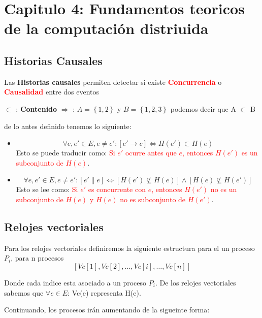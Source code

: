 \section{Capitulo 4: Fundamentos teoricos de la computación distriuida}
\subsection{Historias Causales}
Las \textbf{Historias causales} permiten detectar si existe \textcolor{red}{\textbf{Concurrencia}} o \textcolor{red}{\textbf{Causalidad}} entre dos eventos

\begin{center}
    $\subset$ : \textbf{Contenido} $\Rightarrow$ : $A=\left\{1,2\right\} $ y $B=\left\{1,2,3\right\}$ podemos decir que A $\subset$ B
\end{center}

de lo antes definido tenemos lo siguiente:

\begin{itemize}
    \item \[ \forall e, e' \in E, e \neq e' : [e' \rightarrow e] \Leftrightarrow H(e') \subset H(e) \]
    Esto se puede traducir como: \textcolor{red}{Si $e'$ ocurre antes que $e$, entonces $H(e')$ es un subconjunto de $H(e)$}.

    \item \[ \forall e, e' \in E, e \neq e' : [e' \parallel e] \Leftrightarrow [H(e') \nsubseteq H(e)] \land [H(e) \nsubseteq H(e')] \]
    Esto se lee como: \textcolor{red}{Si $e'$ es concurrente con $e$, entonces $H(e')$ no es un subconjunto de $H(e)$ y $H(e)$ no es subconjunto de $H(e')$}.
\end{itemize}

\subsection{Relojes vectoriales}
Para los relojes vectoriales definiremos la siguiente estructura para el un proceso $P_i$, para n procesos
\[
   \left[ \mathit{Vc}[1], \mathit{Vc}[2], \dots, \mathit{Vc}[i], \dots, \mathit{Vc}[n] \right]
\]

Donde cada indice esta asociado a un proceso $P_i$. De los relojes vectoriales sabemos que $\forall e \in E$: Vc(e) representa H(e).

Continuando, los procesos irán aumentando de la sigueinte forma:

